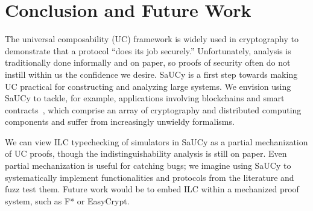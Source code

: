 \section{Conclusion and Future Work}
\label{sec:conclusion}

The universal composability (UC) framework is widely used in cryptography to
demonstrate that a protocol ``does its job securely.'' Unfortunately, analysis
is traditionally done informally and on paper, so proofs of security often do
not instill within us the confidence we desire.
SaUCy is a first step towards making UC practical for constructing
and analyzing large systems.
%
%
We envision using SaUCy to tackle, for example, applications involving blockchains and smart contracts~\cite{dziembowski2018general,miller2017sprites,dziembowski2017perun}, which comprise an array of cryptography and distributed computing components and suffer from increasingly unwieldy formalisms.

We can view ILC typechecking of simulators in SaUCy as a partial
mechanization of UC proofs, though the indistinguishability analysis
is still on paper.
Even partial mechanization is useful for catching
bugs; we imagine using SaUCy to systematically implement
functionalities and protocols from the literature and fuzz test
them.
Future work would be to embed ILC within a mechanized proof system,
such as F* or EasyCrypt.

